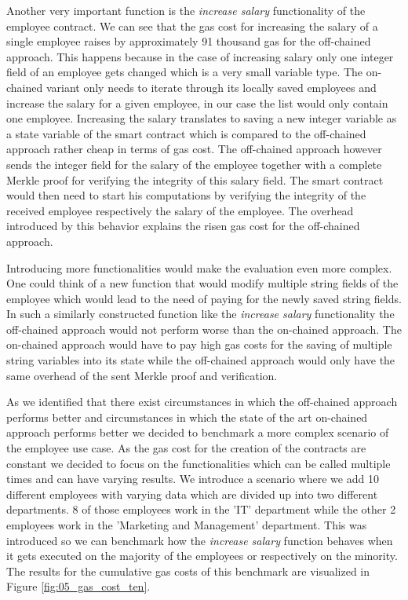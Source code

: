 Another very important function is the \textit{increase salary} functionality of the employee contract. We can see that the gas cost for increasing the salary of a single employee raises by approximately 91 thousand gas for the off-chained approach. This happens because in the case of increasing salary only one integer field of an employee gets changed which is a very small variable type. The on-chained variant only needs to iterate through its locally saved employees and increase the salary for a given employee, in our case the list would only contain one employee. Increasing the salary translates to saving a new integer variable as a state variable of the smart contract which is compared to the off-chained approach rather cheap in terms of gas cost. The off-chained approach however sends the integer field for the salary of the employee together with a complete Merkle proof for verifying the integrity of this salary field. The smart contract would then need to start his computations by verifying the integrity of the received employee respectively the salary of the employee. The overhead introduced by this behavior explains the risen gas cost for the off-chained approach.

Introducing more functionalities would make the evaluation even more complex. One could think of a new function that would modify multiple string fields of the employee which would lead to the need of paying for the newly saved string fields. In such a similarly constructed function like the \textit{increase salary} functionality the off-chained approach would not perform worse than the on-chained approach. The on-chained approach would have to pay high gas costs for the saving of multiple string variables into its state while the off-chained approach would only have the same overhead of the sent Merkle proof and verification.

As we identified that there exist circumstances in which the off-chained approach performs better and circumstances in which the state of the art on-chained approach performs better we decided to benchmark a more complex scenario of the employee use case. As the gas cost for the creation of the contracts are constant we decided to focus on the functionalities which can be called multiple times and can have varying results. We introduce a scenario where we add 10 different employees with varying data which are divided up into two different departments. 8 of those employees work in the 'IT' department while the other 2 employees work in the 'Marketing and Management' department. This was introduced so we can benchmark how the \textit{increase salary} function behaves when it gets executed on the majority of the employees or respectively on the minority. The results for the cumulative gas costs of this benchmark are visualized in Figure \ref{fig:05_gas_cost_ten}.

